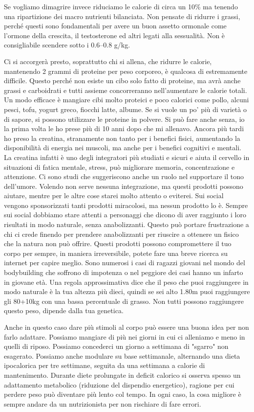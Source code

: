 \documentclass[12pt]{book} %
\begin{document}
Se vogliamo dimagrire invece riduciamo le calorie di circa un 10\% ma tenendo una ripartizione dei macro nutrienti bilanciata. Non pensate di ridurre i grassi, perché questi sono fondamentali per avere un buon assetto ormonale come l'ormone della crescita, il testosterone ed altri legati alla sessualità. Non è consigliabile scendere sotto i 0.6–0.8 g/kg.

Ci si accorgerà presto, soprattutto chi si allena, che ridurre le calorie, mantenendo 2 grammi di proteine per peso corporeo, è qualcosa di estremamente difficile. Questo perché non esiste un cibo solo fatto di proteine, ma avrà anche grassi e carboidrati e tutti assieme concorreranno nell'aumentare le calorie totali. Un modo efficace è mangiare cibi molto proteici e poco calorici come pollo, alcuni pesci, tofu, yogurt greco, fiocchi latte, albume. Se si vuole un po' più di varietà o di sapore, si possono utilizzare le proteine in polvere. Si può fare anche senza, io la prima volta le ho prese più di 10 anni dopo che mi allenavo. Ancora più tardi ho preso la creatina, stranamente non tanto per i benefici fisici, aumentando la disponibilità di energia nei muscoli, ma anche per i benefici cognitivi e mentali. La creatina infatti è uno degli integratori più studiati e sicuri e aiuta il cervello in situazioni di fatica mentale, stress, può migliorare memoria, concentrazione e attenzione. Ci sono studi che suggeriscono anche un ruolo nel supportare il tono dell’umore.
Volendo non serve nessuna integrazione, ma questi prodotti possono aiutare, mentre per le altre cose starei molto attento o eviterei. Sui social vengono sponsorizzati tanti prodotti miracolosi, ma nessun prodotto lo è. Sempre sui social dobbiamo stare attenti a personaggi che dicono di aver raggiunto i loro risultati in modo naturale, senza anabolizzanti. Questo può portare frustrazione a chi ci crede finendo per prendere anabolizzanti per riuscire a ottenere un fisico che la natura non può offrire. Questi prodotti possono compromettere il tuo corpo per sempre, in maniera irreversibile, potete fare una breve ricerca su internet per capire meglio. Sono numerosi i casi di ragazzi giovani nel mondo del bodybuilding che soffrono di impotenza o nel peggiore dei casi hanno un infarto in giovane età. Una regola approssimativa dice che il peso che puoi raggiungere in modo naturale è la tua altezza più dieci, quindi se sei alto 1.80m puoi raggiungere gli 80+10kg con una bassa percentuale di grasso. Non tutti possono raggiungere questo peso, dipende dalla tua genetica.

Anche in questo caso dare più stimoli al corpo può essere una buona idea per non farlo adattare. Possiamo mangiare di più nei giorni in cui ci alleniamo e meno in quelli di riposo. Possiamo concederci un giorno a settimana di "sgarro" non esagerato. Possiamo anche modulare su base settimanale, alternando una dieta ipocalorica per tre settimane, seguita da una settimana a calorie di mantenimento. Durante diete prolungate in deficit calorico si osserva spesso un adattamento metabolico (riduzione del dispendio energetico), ragione per cui perdere peso può diventare più lento col tempo. In ogni caso, la cosa migliore è sempre andare da un nutrizionista per non rischiare di fare errori.
\end{document}
